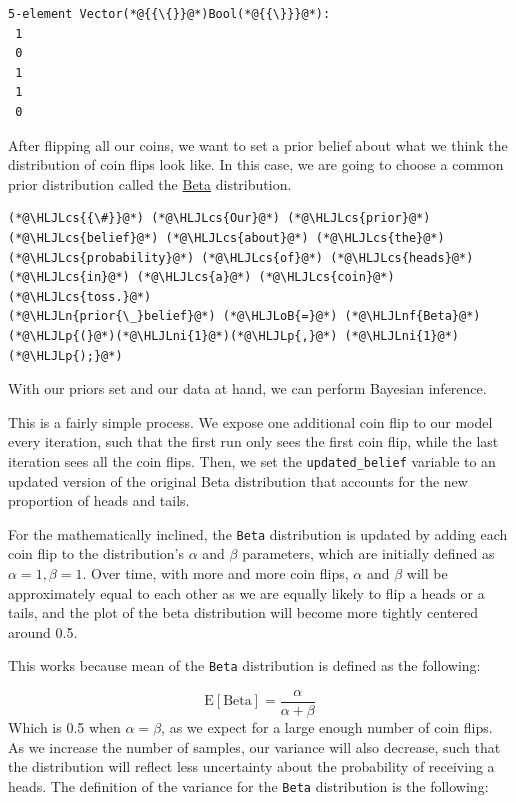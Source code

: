 \documentclass[12pt,a4paper]{article}
\newcommand{\HLJLn}[1]{#1}
\newcommand{\HLJLnf}[1]{\textcolor[RGB]{66,102,213}{#1}}
\newcommand{\HLJLni}[1]{\textcolor[RGB]{59,151,46}{#1}}
\newcommand{\HLJLoB}[1]{\textcolor[RGB]{102,102,102}{\textbf{#1}}}
\newcommand{\HLJLp}[1]{#1}
\newcommand{\HLJLcs}[1]{\textcolor[RGB]{153,153,119}{\textit{#1}}}
\begin{document}
\begin{lstlisting}
5-element Vector(*@{{\{}}@*)Bool(*@{{\}}}@*):
 1
 0
 1
 1
 0
\end{lstlisting}


After flipping all our coins, we want to set a prior belief about what we think the distribution of coin flips look like. In this case, we are going to choose a common prior distribution called the \href{https://en.wikipedia.org/wiki/Beta_distribution}{Beta} distribution.


\begin{lstlisting}
(*@\HLJLcs{{\#}}@*) (*@\HLJLcs{Our}@*) (*@\HLJLcs{prior}@*) (*@\HLJLcs{belief}@*) (*@\HLJLcs{about}@*) (*@\HLJLcs{the}@*) (*@\HLJLcs{probability}@*) (*@\HLJLcs{of}@*) (*@\HLJLcs{heads}@*) (*@\HLJLcs{in}@*) (*@\HLJLcs{a}@*) (*@\HLJLcs{coin}@*) (*@\HLJLcs{toss.}@*)
(*@\HLJLn{prior{\_}belief}@*) (*@\HLJLoB{=}@*) (*@\HLJLnf{Beta}@*)(*@\HLJLp{(}@*)(*@\HLJLni{1}@*)(*@\HLJLp{,}@*) (*@\HLJLni{1}@*)(*@\HLJLp{);}@*)
\end{lstlisting}


With our priors set and our data at hand, we can perform Bayesian inference.

This is a fairly simple process. We expose one additional coin flip to our model every iteration, such that the first run only sees the first coin flip, while the last iteration sees all the coin flips. Then, we set the \texttt{updated\_belief} variable to an updated version of the original Beta distribution that accounts for the new proportion of heads and tails. 

For the mathematically inclined, the \texttt{Beta} distribution is updated by adding each coin flip to the distribution's $\alpha$ and $\beta$ parameters, which are initially defined as $\alpha = 1, \beta = 1$. Over time, with more and more coin flips, $\alpha$ and $\beta$ will be approximately equal to each other as we are equally likely to flip a heads or a tails, and the plot of the beta distribution will become more tightly centered around 0.5. 

This works because mean of the \texttt{Beta} distribution is defined as the following:

\[
\text{E}[\text{Beta}] = \dfrac{\alpha}{\alpha+\beta}
\]
Which is 0.5 when $\alpha = \beta$, as we expect for a large enough number of coin flips. As we increase the number of samples, our variance will also decrease, such that the distribution will reflect less uncertainty about the probability of receiving a heads. The definition of the variance for the \texttt{Beta} distribution is the following:
\end{document}
